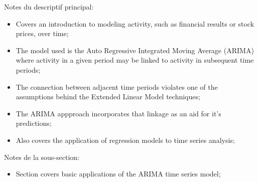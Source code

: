 \documentclass[12pt, titlepage, french]{report}
\begin{document}
\begin{distributions}[Description]
Notes du descriptif principal:
\begin{itemize}
	\item	Covers an introduction to modeling activity, such as financial results or stock prices, over time;
	\item	The model used is the Auto Regressive Integrated Moving Average (ARIMA) where activity in a given period may be linked to activity in subsequent time periods;
	\item	The connection between adjacent time periods violates one of the assumptions behind the Extended Linear Model techniques;
	\item	The ARIMA appproach incorporates that linkage as an aid for it's predictions;
	\item	Also covers the application of regression models to time series analysis;
\end{itemize}
\tcbline
Notes de la sous-section:
\begin{itemize}
	\item	Section covers basic applications of the ARIMA time series model;
\end{itemize}
\end{distributions}
\end{document}
